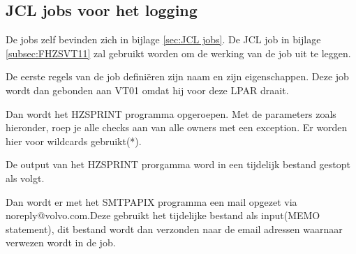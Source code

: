 \subsection{JCL jobs voor het logging}
\label{subsec:JCL jobs voor het logging}
De jobs zelf bevinden zich in bijlage \ref{sec:JCL jobs}. De JCL job in bijlage \ref{subsec:FHZSVT11} zal gebruikt worden om de werking van de job uit te leggen.

De eerste regels van de job definiëren zijn naam en zijn eigenschappen. Deze job wordt dan gebonden aan VT01 omdat hij voor deze LPAR draait.


Dan wordt het HZSPRINT programma opgeroepen. Met de parameters zoals hieronder, roep je alle checks aan van alle owners met een exception. Er worden hier voor wildcards gebruikt(*). 


De output van het HZSPRINT prorgamma word in een tijdelijk bestand gestopt als volgt.


Dan wordt er met het SMTPAPIX programma een mail opgezet via noreply@volvo.com.Deze gebruikt het tijdelijke bestand als input(MEMO statement), dit bestand wordt dan verzonden naar de email adressen waarnaar verwezen wordt in de job.

